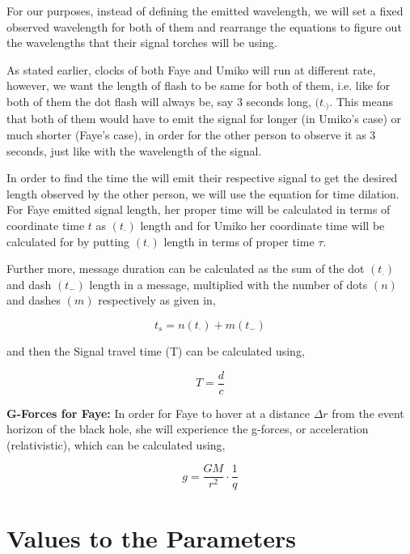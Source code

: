 \documentclass[9pt,a4paper,twocolumn,twoside]{tau-class/tau}
\begin{document}
    For our purposes, instead of defining the emitted wavelength, we will set a fixed observed wavelength for both of them and rearrange the equations to figure out the wavelengths that their signal torches will be using.

    As stated earlier, clocks of both Faye and Umiko will run at different rate, however, we want the length of flash to be same for both of them, i.e. like for both of them the dot flash will always be, say \(3\) seconds long, \((t_{\cdot)}\). This means that both of them would have to emit the signal for longer (in Umiko's case) or much shorter (Faye's case), in order for the other person to observe it as \(3\) seconds, just like with the wavelength of the signal. 

    In order to find the time the will emit their respective signal to get the desired length observed by the other person, we will use the equation for time dilation. For Faye emitted signal length, her proper time will be calculated in terms of coordinate time \(t\) as \((t_{\cdot})\) length and for Umiko her coordinate time will be calculated for by putting \((t_{\cdot})\) length in terms of proper time \(\tau\).
    
    Further more, message duration can be calculated as the sum of the dot \((t_{\cdot})\) and dash \((t_{-})\) length in a message, multiplied with the number of dots \((n)\) and dashes \((m)\) respectively as given in, 
    
    \begin{equation}
      \boxed{t_s = n(t_{\cdot}) + m(t_{-})}
    \end{equation}

    and then the Signal travel time (T) can be calculated using, 

    \begin{equation}
      \boxed{T = \frac{d}{c}}
    \end{equation}
    

    \begin{info}
      \textbf{G-Forces for Faye:} In order for Faye to hover at a distance \(\Delta r\) from the event horizon of the black hole, she will experience the g-forces, or acceleration (relativistic), which can be calculated using, 

      \begin{equation}
        \boxed{g = \frac{GM}{r^2} \cdot\frac{1}{q}}
      \end{equation}
    \end{info}
  \section{Values to the Parameters}
\end{document}
